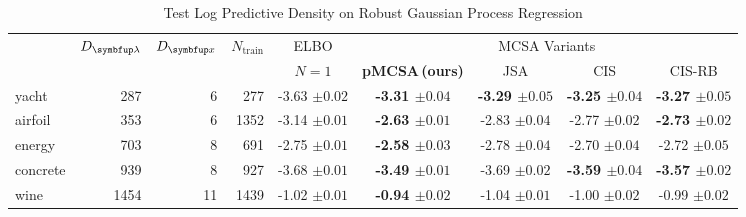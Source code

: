 
\begin{table*}
  \centering
  \caption{Test Log Predictive Density on Robust Gaussian Process Regression}\label{table:gp}
  \vspace{-0.05in}
  \setlength{\tabcolsep}{4pt}
  \begin{threeparttable}
  \begin{tabular}{lrrrccccc}
    \toprule
    & \multicolumn{1}{c}{\multirow{2}{*}{\footnotesize\(D_{\vlambda}\)}} & \multicolumn{1}{c}{\multirow{2}{*}{\(D_{\vx}\)}} &  \multicolumn{1}{c}{\multirow{2}{*}{\(N_{\text{train}}\)}} & \multicolumn{1}{c}{\multirow{1}{*}{ELBO}} & \multicolumn{4}{c}{MCSA Variants} \\\cmidrule(lr){5-5}\cmidrule(lr){6-9}
   & & & & \(N=1\) & \multicolumn{1}{c}{\multirow{1}{*}{\footnotesize\textbf{pMCSA{\scriptsize\,(ours)}}}} & \multicolumn{1}{c}{\multirow{1}{*}{\footnotesize{JSA}}} & \multicolumn{1}{c}{\multirow{1}{*}{\footnotesize{CIS}}} & \multicolumn{1}{c}{\multirow{1}{*}{\footnotesize{CIS-RB}}}\\
    \midrule
    yacht & 287 & 6 & 277 & {-3.63 {\scriptsize{\(\pm 0.02\)}}} & {\bf-3.31 {\scriptsize{\(\pm 0.04\)}}} & {\bf-3.29 {\scriptsize{\(\pm 0.05\)}}} & {\bf-3.25 {\scriptsize{\(\pm 0.04\)}}} & {\bf-3.27 {\scriptsize{\(\pm 0.05\)}}} \\
    airfoil & 353 & 6 & 1352 & {-3.14 {\scriptsize{\(\pm 0.01\)}}} & {\bf-2.63 {\scriptsize{\(\pm 0.01\)}}} & {-2.83 {\scriptsize{\(\pm 0.04\)}}} & {-2.77 {\scriptsize{\(\pm 0.02\)}}} & {\bf-2.73 {\scriptsize{\(\pm 0.02\)}}}\\
    energy & 703 & 8 & 691 & {-2.75 {\scriptsize{\(\pm 0.01\)}}} & {\bf-2.58 {\scriptsize{\(\pm 0.03\)}}} & {-2.78 {\scriptsize{\(\pm 0.04\)}}} & {-2.70 {\scriptsize{\(\pm 0.04\)}}} & {-2.72 {\scriptsize{\(\pm 0.05\)}}} \\
    concrete & 939 & 8 & 927 & {-3.68 {\scriptsize{\(\pm 0.01\)}}} & {\bf-3.49 {\scriptsize{\(\pm 0.01\)}}} & {-3.69 {\scriptsize{\(\pm 0.02\)}}} & {\bf-3.59 {\scriptsize{\(\pm 0.04\)}}} & {\bf-3.57 {\scriptsize{\(\pm 0.02\)}}} \\
    wine & 1454 & 11 & 1439 & {-1.02 {\scriptsize{\(\pm 0.01\)}}} & {\bf-0.94 {\scriptsize{\(\pm 0.02\)}}} & {-1.04 {\scriptsize{\(\pm 0.01\)}}} & {-1.00 {\scriptsize{\(\pm 0.02\)}}} & {-0.99 {\scriptsize{\(\pm 0.02\)}}} 

\end{tabular}
\end{threeparttable}
\end{table*}
